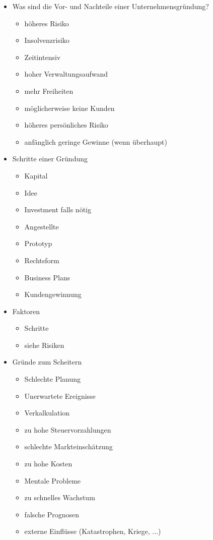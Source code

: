 \begin{itemize}
\begin{itemize}
    \end{itemize}\newpage
    \item Was sind die Vor- und Nachteile einer Unternehmensgründung?
    \begin{itemize}
        \item höheres Risiko
        \item Insolvenzrisiko
        \item Zeitintensiv
        \item hoher Verwaltungsaufwand
        \item mehr Freiheiten
        \item möglicherweise keine Kunden
        \item höheres persönliches Risiko
        \item anfänglich geringe Gewinne (wenn überhaupt) 
    \end{itemize}
    \item Schritte einer Gründung
    \begin{itemize}
        \item Kapital
        \item Idee
        \item Investment falls nötig
        \item Angestellte
        \item Prototyp
        \item Rechtsform
        \item Business Plans
        \item Kundengewinnung
    \end{itemize}
    \item Faktoren
    \begin{itemize}
        \item Schritte
        \item siehe Risiken
    \end{itemize}
    \item Gründe zum Scheitern
    \begin{itemize}
        \item Schlechte Planung
        \item Unerwartete Ereignisse
        \item Verkalkulation
        \item zu hohe Steuervorzahlungen
        \item schlechte Markteinschätzung
        \item zu hohe Kosten
        \item Mentale Probleme
        \item zu schnelles Wachstum
        \item falsche Prognosen
        \item externe Einflüsse (Katastrophen, Kriege, ...) 
    \end{itemize}
\end{itemize}
